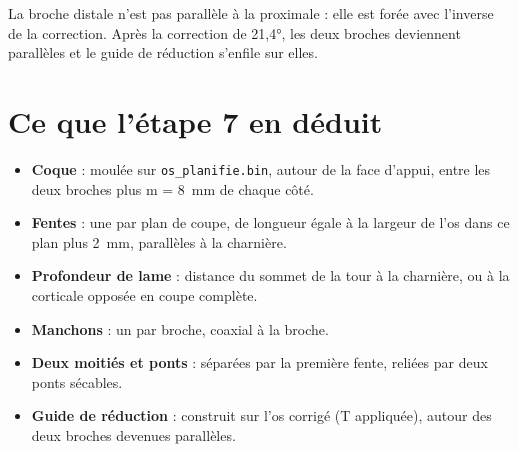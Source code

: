 \documentclass[11pt,a4paper]{article}
\newcommand{\champ}[1]{\texttt{\small #1}}
\begin{document}
La broche distale n'est pas parallèle à la proximale : elle est forée avec l'inverse de la correction. Après la
correction de 21,4°, les deux broches deviennent parallèles et le guide de réduction s'enfile sur elles.

\section{Ce que l'étape 7 en déduit}

\begin{itemize}
  \item \textbf{Coque} : moulée sur \champ{os\_planifie.bin}, autour de la face d'appui, entre les deux broches plus
        m = 8~mm de chaque côté.
  \item \textbf{Fentes} : une par plan de coupe, de longueur égale à la largeur de l'os dans ce plan plus 2~mm,
        parallèles à la charnière.
  \item \textbf{Profondeur de lame} : distance du sommet de la tour à la charnière, ou à la corticale opposée en coupe
        complète.
  \item \textbf{Manchons} : un par broche, coaxial à la broche.
  \item \textbf{Deux moitiés et ponts} : séparées par la première fente, reliées par deux ponts sécables.
  \item \textbf{Guide de réduction} : construit sur l'os corrigé (T appliquée), autour des deux broches devenues
        parallèles.
\end{itemize}
\end{document}
